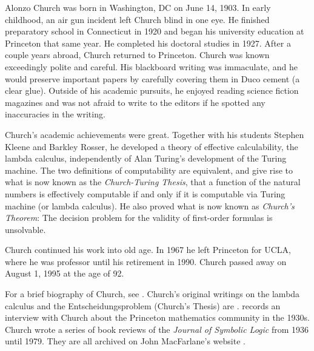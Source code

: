 \documentclass[../../../include/open-logic-section]{subfiles}
\begin{document}



Alonzo Church was born in Washington, DC on June 14, 1903.  In early
childhood, an air gun incident left Church blind in one eye. He
finished preparatory school in Connecticut in 1920 and began his
university education at Princeton that same year. He completed his
doctoral studies in 1927. After a couple years abroad, Church returned
to Princeton. Church was known exceedingly polite and careful. His
blackboard writing was immaculate, and he would preserve important
papers by carefully covering them in Duco cement (a clear
glue). Outside of his academic pursuits, he enjoyed reading science
fiction magazines and was not afraid to write to the editors if he
spotted any inaccuracies in the writing.

Church's academic achievements were great.  Together with his students
Stephen Kleene and Barkley Rosser, he developed a theory of effective
calculability, the lambda calculus, independently of Alan Turing's
development of the Turing machine. The two definitions of
computability are equivalent, and give rise to what is now known as
the \emph{Church-Turing Thesis}, that a function of the natural
numbers is effectively computable if and only if it is computable via
Turing machine (or lambda calculus). He also proved what is now known
as \emph{Church's Theorem}: The decision problem for the validity of
first-order formulas is unsolvable.

Church continued his work into old age. In 1967 he left Princeton for
UCLA, where he was professor until his retirement in 1990. Church
passed away on August 1, 1995 at the age of 92.

\begin{reading} 
For a brief biography of Church, see \citet{EndertonND}.  Church's
original writings on the lambda calculus and the Entscheidungsproblem
(Church's Thesis) are \citet{Church1936,Church1936a}.
\citet{Aspray1984} records an interview with Church about the
Princeton mathematics community in the 1930s.
Church wrote a series of book reviews of the \emph{Journal of
Symbolic Logic} from 1936 until 1979. They are all archived on John
MacFarlane's website \citep{MacFarlane2015}.
\end{reading} 
\end{document}

